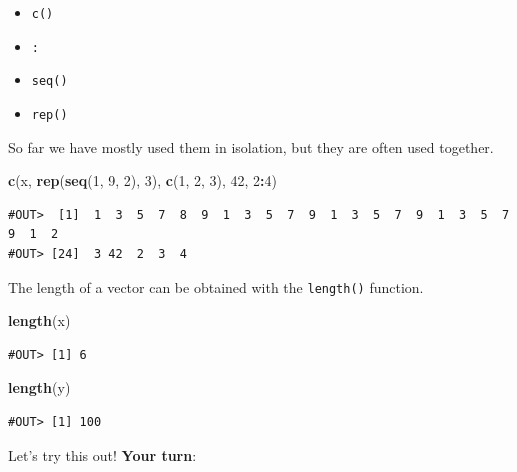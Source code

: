 \documentclass[]{book}
\newenvironment{Shaded}{\begin{snugshade}}{\end{snugshade}}
\newcommand{\KeywordTok}[1]{\textcolor[rgb]{0.13,0.29,0.53}{\textbf{#1}}}
\newcommand{\DecValTok}[1]{\textcolor[rgb]{0.00,0.00,0.81}{#1}}
\newcommand{\OperatorTok}[1]{\textcolor[rgb]{0.81,0.36,0.00}{\textbf{#1}}}
\newcommand{\NormalTok}[1]{#1}
\providecommand{\tightlist}{%
  \setlength{\itemsep}{0pt}\setlength{\parskip}{0pt}}
\newenvironment{warning}{\begin{tcolorbox}[colback=orange!5!white,colframe=orange,title=\textbf{Warning!}]}{\end{tcolorbox}}
\theoremstyle{definition}
\theoremstyle{definition}
\theoremstyle{definition}
\theoremstyle{remark}
\begin{document}
\begin{itemize}
\tightlist
\item
  \texttt{c()}
\item
  \texttt{:}
\item
  \texttt{seq()}
\item
  \texttt{rep()}
\end{itemize}

So far we have mostly used them in isolation, but they are often used
together.

\begin{Shaded}
\begin{Highlighting}[]
\KeywordTok{c}\NormalTok{(x, }\KeywordTok{rep}\NormalTok{(}\KeywordTok{seq}\NormalTok{(}\DecValTok{1}\NormalTok{, }\DecValTok{9}\NormalTok{, }\DecValTok{2}\NormalTok{), }\DecValTok{3}\NormalTok{), }\KeywordTok{c}\NormalTok{(}\DecValTok{1}\NormalTok{, }\DecValTok{2}\NormalTok{, }\DecValTok{3}\NormalTok{), }\DecValTok{42}\NormalTok{, }\DecValTok{2}\OperatorTok{:}\DecValTok{4}\NormalTok{)}
\end{Highlighting}
\end{Shaded}

\begin{verbatim}
#OUT>  [1]  1  3  5  7  8  9  1  3  5  7  9  1  3  5  7  9  1  3  5  7  9  1  2
#OUT> [24]  3 42  2  3  4
\end{verbatim}

The length of a vector can be obtained with the \texttt{length()}
function.

\begin{Shaded}
\begin{Highlighting}[]
\KeywordTok{length}\NormalTok{(x)}
\end{Highlighting}
\end{Shaded}

\begin{verbatim}
#OUT> [1] 6
\end{verbatim}

\begin{Shaded}
\begin{Highlighting}[]
\KeywordTok{length}\NormalTok{(y)}
\end{Highlighting}
\end{Shaded}

\begin{verbatim}
#OUT> [1] 100
\end{verbatim}

\begin{warning}
Let's try this out! \textbf{Your turn}:
\end{warning}
\end{document}
